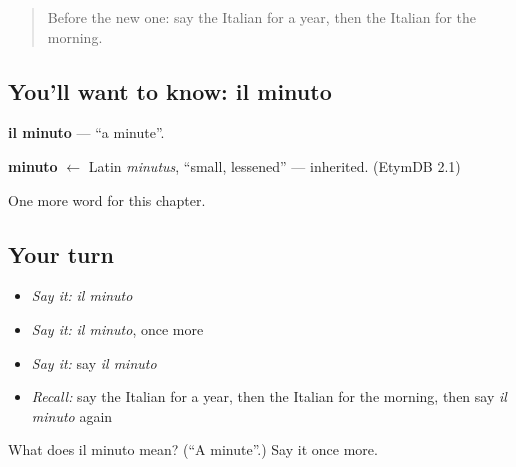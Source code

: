 \begin{quote}
Before the new one: say the Italian for a year, then the Italian for the morning.
\end{quote}

\subsection*{You'll want to know: il minuto}
\textbf{il minuto} — \textquotedblleft{}a minute\textquotedblright{}.

\begin{cousinweb}
\textbf{minuto} $\leftarrow$ Latin \emph{minutus}, \textquotedblleft{}small, lessened\textquotedblright{} — inherited. (EtymDB 2.1)
\end{cousinweb}

\begin{grammarlens}[title={What you've built}]
One more word for this chapter.
\end{grammarlens}

\subsection*{Your turn}
\begin{itemize}
\raggedright
  \item \emph{Say it:} \emph{il minuto}
  \item \emph{Say it:} \emph{il minuto}, once more
  \item \emph{Say it:} say \emph{il minuto}
  \item \emph{Recall:} say the Italian for a year, then the Italian for the morning, then say \emph{il minuto} again
\end{itemize}

\begin{tcolorbox}[breakable,colback=teal!4,colframe=teal!35!black,title={Before you move on}]
What does il minuto mean? (\textquotedblleft{}A minute\textquotedblright{}.) Say it once more.
\end{tcolorbox}
